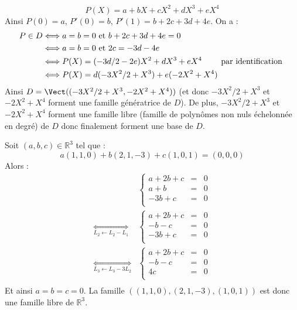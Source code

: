 \documentclass[a4paper,twoside,french,11pt]{VcCours}
\begin{document}
\begin{enumerate}
$$ P(X) = a+bX+cX^2+dX^3+eX^4$$
Ainsi $P(0)=a$, $P'(0) =b$, $P'(1)=b+2c+3d+4e$. On a :
\begin{align*}
P \in D & \Longleftrightarrow a=b=0 \hbox{ et } b+2c+3d+4e = 0 \\
& \Longleftrightarrow a=b=0 \hbox{ et } 2c=-3d-4e \\
& \Longleftrightarrow P(X) = (-3d/2-2e)X^2+dX^3+eX^4 \qquad \hbox{ par identification }\\
& \Longleftrightarrow P(X) = d(-3X^2/2+X^3) + e(-2X^2+X^4) \\
\end{align*}
Ainsi $D= \Vect((-3X^2/2+X^3, -2X^2+X^4))$ (et donc $-3X^2/2+X^3$ et $-2X^2+X^4$ forment une famille génératrice de $D$). De plus, $-3X^2/2+X^3$ et $-2X^2+X^4$ forment une famille libre (famille de polynômes non nuls échelonnée en degré) de $D$ donc finalement forment une base de $D$.
\end{enumerate}



\begin{Exercice}{}\end{Exercice}Soit $(a,b,c) \in \mathbb{R}^3$ tel que :
$$ a (1,1,0) + b (2,1,-3) + c (1,0,1) = (0,0,0)$$
Alors :
$$ \begin{array}{cl}
& \left\lbrace \begin{array}{ccl}
a+2b+c & = &0 \\
a+b & = & 0 \\
-3b + c & = & 0 \\
\end{array}\right.  \\
\underset{L_2 \leftarrow L_2-L_1}{\Longleftrightarrow} & \left\lbrace \begin{array}{ccl}
a+2b+c & = &0 \\
-b-c & = & 0 \\
-3b + c & = & 0 \\
\end{array}\right.  \\
\underset{L_3 \leftarrow L_3-3L_2}{\Longleftrightarrow} & \left\lbrace \begin{array}{ccl}
a+2b+c & = &0 \\
-b-c & = & 0 \\
4c & = & 0 \\
\end{array}\right.  \\
\end{array}$$
Et ainsi $a=b=c=0$. La famille $((1,1,0), (2,1,-3),(1,0,1))$ est donc une famille libre de $\mathbb{R}^3$.
\end{document}
